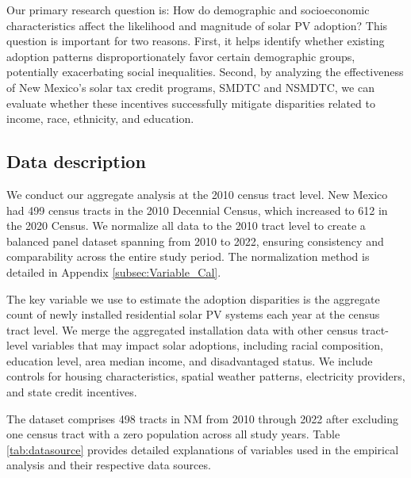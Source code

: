 \documentclass[11pt,twoside,letterpaper]{article}
\begin{document}
Our primary research question is: How do demographic and socioeconomic characteristics affect the likelihood and magnitude of solar PV adoption? This question is important for two reasons. First, it helps identify whether existing adoption patterns disproportionately favor certain demographic groups, potentially exacerbating social inequalities. Second, by analyzing the effectiveness of New Mexico's solar tax credit programs, SMDTC and NSMDTC, we can evaluate whether these incentives successfully mitigate disparities related to income, race, ethnicity, and education. 

\subsection{Data description}

We conduct our aggregate analysis at the 2010 census tract level. New Mexico had 499 census tracts in the 2010 Decennial Census, which increased to 612 in the 2020 Census. We normalize all data to the 2010 tract level to create a balanced panel dataset spanning from 2010 to 2022, ensuring consistency and comparability across the entire study period. The normalization method is detailed in Appendix \ref{subsec:Variable_Cal}.

The key variable we use to estimate the adoption disparities is the aggregate count of newly installed residential solar PV systems each year at the census tract level. We merge the aggregated installation data with other census tract-level variables that may impact solar adoptions, including racial composition, education level, area median income, and disadvantaged status. We include controls for housing characteristics, spatial weather patterns, electricity providers, and state credit incentives.

The dataset comprises 498 tracts in NM from 2010 through 2022 after excluding one census tract with a zero population across all study years. Table \ref{tab:datasource} provides detailed explanations of variables used in the empirical analysis and their respective data sources. 
\end{document}
